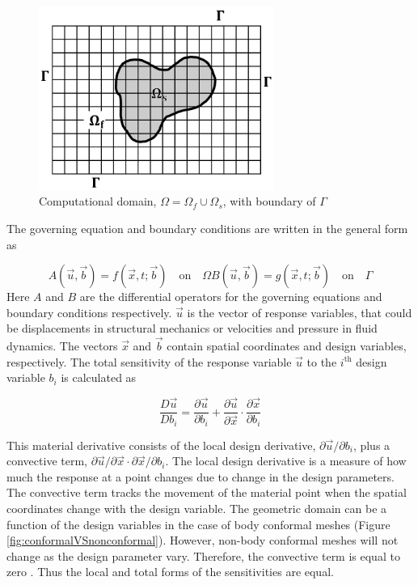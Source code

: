 \documentclass[12pt]{aiaa-pretty}
\begin{document}
%
\begin{figure}[H]
	\centering
	\includegraphics[height=6.0cm]{figure/domain.jpg}
	\caption{Computational domain, $\Omega = \Omega_f \cup \Omega_s$, with boundary of $\Gamma$}
	\label{fig:domain}
\end{figure}
%

The governing equation and boundary conditions are written in the general form as

%
\begin{subequations}\label{eq:generalFormForGE}
\begin{equation}
	A(\vec{u}, \vec{b}) = f(\vec{x}, t; \vec{b}) \quad \text{on} \quad \Omega
\end{equation}
\begin{equation}
	B(\vec{u}, \vec{b}) = g(\vec{x}, t; \vec{b}) \quad \text{on} \quad \Gamma
\end{equation}
\end{subequations}
%
Here $A$ and $B$ are the differential operators for the governing equations and boundary conditions respectively. $\vec{u}$ is the vector of response variables, that could be displacements in structural mechanics or velocities and pressure in fluid dynamics. The vectors $\vec{x}$ and $\vec{b}$ contain spatial coordinates and design variables, respectively. The total sensitivity of the response variable $\vec{u}$ to the $i^\text{th}$ design variable $b_i$ is calculated as

%
\begin{equation}
	\frac{D\vec{u}}{Db_i	} = \frac{\partial \vec{u}}{\partial b_i} + 
	                        \frac{\partial \vec{u}}{\partial \vec{x}} \cdot \frac{\partial \vec{x}}{\partial b_i}
\end{equation}
%

This material derivative consists of the local design derivative, $\partial \vec{u} / \partial b_i$, plus a convective term, $\partial \vec{u} / \partial \vec{x} \cdot \partial \vec{x} / \partial b_i$. The local design derivative is a measure of how much the response at a point changes due to change in the design parameters. The convective term tracks the movement of the material point when the spatial coordinates change with the design variable. The geometric domain can be a function of the design variables in the case of body conformal meshes (Figure \ref{fig:conformalVSnonconformal}). However, non-body conformal meshes will not change as the design parameter vary. Therefore, the convective term is equal to zero \cite{gobal2014continuum}. Thus the local and total forms of the sensitivities are equal.
\end{document}

